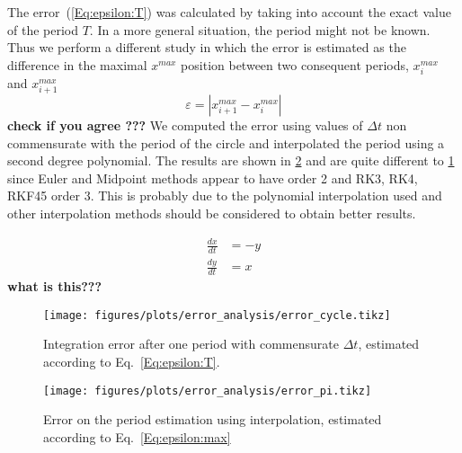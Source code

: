 The error~(\ref{Eq:epsilon:T}) was calculated by taking into account the exact value of the period $T$. In a more general situation, the period might not be known. Thus we perform a different study in which the error is estimated as the difference in the maximal $x^{max}$ position between two consequent periods, $x^{max}_i$ and $x^{max}_{i+1}$
\begin{equation}
\varepsilon = |x^{max}_{i+1} - x^{max}_{i}|
\label{Eq:epsilon:max}
\end{equation}
{\bf check if you  agree ???}
We computed the error using values of $\Delta t$ non commensurate with the period of the circle and interpolated the period using a second degree polynomial. The results are shown in \cref{fig:error_pi} and are quite different to \cref{fig:error_cycle} since Euler and Midpoint methods appear to have order 2 and RK3, RK4, RKF45 order 3. This is probably due to the polynomial interpolation used and other interpolation methods should be considered to obtain better results. 

\begin{align}\label{eq:circle}
    \frac{dx}{dt} &= -y \nonumber \\
    \frac{dy}{dt} &= x
\end{align}
{\bf what is this???}

\begin{figure}[H]
    \centering
    \texttt{[image: figures/plots/error\_analysis/error\_cycle.tikz]}
    \caption{Integration error after one period with commensurate $\Delta t$, estimated according to Eq.~\ref{Eq:epsilon:T}.}
    \label{fig:error_cycle}
\end{figure}

\begin{figure}[H]
    \centering
    \texttt{[image: figures/plots/error\_analysis/error\_pi.tikz]}
    \caption{Error on the period estimation using interpolation, estimated according to Eq.~\ref{Eq:epsilon:max}}
    \label{fig:error_pi}
\end{figure}

